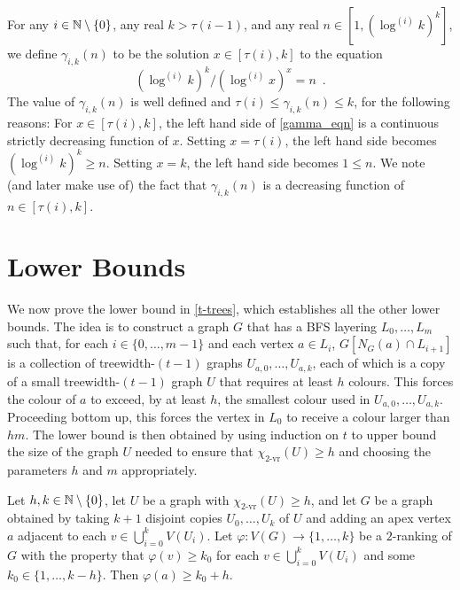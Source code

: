 \documentclass[kpfonts]{patmorin}
\newcommand{\rn}[1]{\chi_{\operatorname{#1-vr}}}
\newcommand{\trn}{\rn{2}}
\theoremstyle{named}
\begin{document}
For any $i\in\mathbb{N}\setminus\{0\}$, any real $k>\tau(i-1)$, and any real $n\in[1,(\log^{(i)} k)^k]$, we define $\gamma_{i,k}(n)$ to be the solution $x\in[\tau(i),k]$ to the equation
\begin{equation}
   (\log^{(i)} k)^k/(\log^{(i)} x)^{x}=n \enspace .  \label{gamma_eqn}
\end{equation}
The value of $\gamma_{i,k}(n)$ is well defined and $\tau(i)\le \gamma_{i,k}(n)\le k$, for the following reasons:  For $x\in[\tau(i),k]$, the left hand side of \cref{gamma_eqn} is a continuous strictly decreasing function of $x$. Setting $x=\tau(i)$, the left hand side becomes $(\log^{(i)} k)^k \ge n$. Setting $x=k$, the left hand side becomes $1\le n$.  We note (and later make use of) the fact that $\gamma_{i,k}(n)$ is a decreasing function of $n\in [\tau(i),k]$.

\section{Lower Bounds}
\label{lower-bounds}

We now prove the lower bound in \cref{t-trees}, which establishes all the other lower bounds. The idea is to construct a graph $G$ that has a BFS layering $L_0,\ldots,L_m$ such that, for each $i\in\{0,\ldots,m-1\}$ and each vertex $a\in L_i$, $G[N_G(a)\cap L_{i+1}]$ is a collection of treewidth-$(t-1)$ graphs $U_{a,0},\ldots,U_{a,k}$, each of which is a copy of a small treewidth-$(t-1)$ graph $U$ that requires at least $h$ colours.  This forces the colour of $a$ to exceed, by at least $h$, the smallest colour used in $U_{a,0},\ldots,U_{a,k}$.  Proceeding bottom up, this forces the vertex in $L_0$ to receive a colour larger than $hm$.  The lower bound is then obtained by using induction on $t$ to upper bound the size of the graph $U$ needed to ensure that $\trn(U)\ge h$ and choosing the parameters $h$ and $m$ appropriately.

\begin{lem}\label{apex-graph}
    Let $h,k\in\mathbb{N}\setminus\{0\}$, let $U$ be a graph with $\trn(U)\ge h$, and let $G$ be a graph obtained by taking $k+1$ disjoint copies $U_0,\ldots,U_k$ of $U$ and adding an apex vertex $a$ adjacent to each $v\in\bigcup_{i=0}^k V(U_i)$.  Let $\varphi:V(G)\to\{1,\ldots,k\}$ be a $2$-ranking of $G$ with the property that $\varphi(v)\ge k_0$ for each $v\in\bigcup_{i=0}^k V(U_i)$ and some $k_0\in\{1,\ldots,k-h\}$.  Then $\varphi(a) \ge k_0+h$.
\end{lem}
\end{document}
